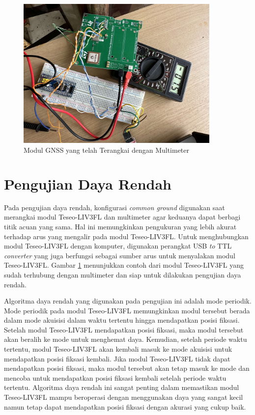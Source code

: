 \begin{figure}[H]
	\centering
	\includegraphics[width=10cm]{contents/chapter-4/low-power.jpg}
	\caption{Modul GNSS yang telah Terangkai dengan Multimeter}
	\label{Fig: low-power-connected}
\end{figure}

\section{Pengujian Daya Rendah}
Pada pengujian daya rendah, konfigurasi \textit{common ground} digunakan saat merangkai modul Teseo-LIV3FL dan multimeter agar keduanya dapat berbagi titik acuan yang sama. Hal ini memungkinkan pengukuran yang lebih akurat terhadap arus yang mengalir pada modul Teseo-LIV3FL. Untuk menghubungkan modul Teseo-LIV3FL dengan komputer, digunakan perangkat USB \textit{to} TTL \textit{converter} yang juga berfungsi sebagai sumber arus untuk menyalakan modul Teseo-LIV3FL. Gambar \ref{Fig: low-power-connected} menunjukkan contoh dari modul Teseo-LIV3FL yang sudah terhubung dengan multimeter dan siap untuk dilakukan pengujian daya rendah.

Algoritma daya rendah yang digunakan pada pengujian ini adalah mode periodik. Mode periodik pada modul Teseo-LIV3FL memungkinkan modul tersebut berada dalam mode akuisisi dalam waktu tertentu hingga mendapatkan posisi fiksasi. Setelah modul Teseo-LIV3FL mendapatkan posisi fiksasi, maka modul tersebut akan beralih ke mode \textit{} untuk menghemat daya. Kemudian, setelah periode waktu tertentu, modul Teseo-LIV3FL akan kembali masuk ke mode akuisisi untuk mendapatkan posisi fiksasi kembali. Jika modul Teseo-LIV3FL tidak dapat mendapatkan posisi fiksasi, maka modul tersebut akan tetap masuk ke mode \textit{} dan mencoba untuk mendapatkan posisi fiksasi kembali setelah periode waktu tertentu. Algoritma daya rendah ini sangat penting dalam memastikan modul Teseo-LIV3FL mampu beroperasi dengan menggunakan daya yang sangat kecil namun tetap dapat mendapatkan posisi fiksasi dengan akurasi yang cukup baik.

